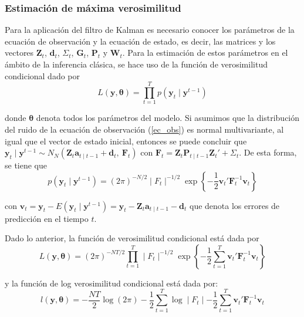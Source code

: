 \subsubsection{Estimación de máxima verosimilitud}
Para la aplicación del filtro de Kalman es necesario conocer los parámetros de la ecuación de observación y la ecuación de estado, es decir, las matrices y los vectores $\mathbf{Z}_t$, $\mathbf{d}_t$, $\Sigma_t$, $\mathbf{G}_t$, $\mathbf{P}_t$ y $\mathbf{W}_t$. Para la estimación de estos parámetros en el ámbito de la inferencia clásica, se hace uso de la función de verosimilitud condicional dado por
\begin{equation*}
L(\mathbf{y},\boldsymbol{\theta})=\prod_{t=1}^Tp(\mathbf{y}_t\mid \mathbf{y}^{t-1})
\end{equation*}

donde $\mathbf{\theta}$ denota todos los parámetros del modelo. Si asumimos que la distribución del ruido de la ecuación de observación (\ref{ec_obs}) es normal multivariante, al igual que el vector de estado inicial, entonces se puede concluir que $\mathbf{y}_t\mid \mathbf{y}^{t-1}\sim N_N(\mathbf{Z}_t\mathbf{a}_{t\mid t-1}+\mathbf{d}_t,\ \mathbf{F}_t)$ con $\mathbf{F}_t=\mathbf{Z}_t\mathbf{P}_{t\mid t-1}\mathbf{Z}_t'+\Sigma_t$. De esta forma, se tiene que
\begin{equation*}
p(\mathbf{y}_t\mid \mathbf{y}^{t-1})=(2\pi)^{-N/2}\mid F_t\mid^{-1/2}\exp\left\{-\frac{1}{2}\mathbf{v}_t'\mathbf{F}_t^{-1}\mathbf{v}_t\right\}
\end{equation*}

con $\mathbf{v}_t=\mathbf{y}_t-E(\mathbf{y}_t\mid\mathbf{y}^{t-1})=\mathbf{y}_t-\mathbf{Z}_t\mathbf{a}_{t\mid t-1}-\mathbf{d}_t$ que denota los errores de predicción en el tiempo $t$. 

Dado lo anterior, la función de verosimilitud condicional está dada por
\begin{equation*}
L(\mathbf{y},\mathbf{\theta})=(2\pi)^{-NT/2}\prod_{t=1}^T\mid F_t\mid^{-1/2}\exp\left\{-\frac{1}{2}\sum_{t=1}^T\mathbf{v}_t'\mathbf{F}_t^{-1}\mathbf{v}_t\right\}
\end{equation*}

y la función de log verosimilitud condicional está dada por:
\begin{equation*}
l(\mathbf{y},\mathbf{\theta})=-\frac{NT}{2}\log (2\pi)-\frac{1}{2}\sum_{t=1}^T\log\mid F_t\mid-\frac{1}{2}\sum_{t=1}^T\mathbf{v}_t'\mathbf{F}_t^{-1}\mathbf{v}_t
\end{equation*}

